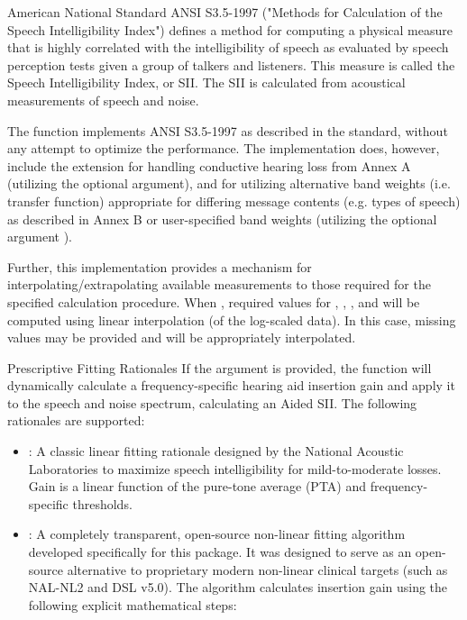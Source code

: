 \documentclass[letterpaper]{book}
\begin{document}
\begin{Details}
American National Standard ANSI S3.5-1997 ("Methods for Calculation of
the Speech Intelligibility Index") defines a method for computing a
physical measure that is highly correlated with the intelligibility
of speech as evaluated by speech perception tests given a group of
talkers and listeners. This measure is called the Speech
Intelligibility Index, or SII. The SII is calculated from acoustical
measurements of speech and noise.

The  function implements ANSI S3.5-1997 as described in
the standard, without any attempt to optimize the performance. The
implementation does, however, include the extension for handling
conductive hearing loss from Annex A (utilizing the optional
 argument), and for utilizing alternative band weights
(i.e. transfer function) appropriate for differing message contents
(e.g. types of speech) as described in Annex B or user-specified
band weights (utilizing the optional argument ).

Further, this implementation provides a mechanism for
interpolating/extrapolating available measurements to those required
for the specified calculation procedure.  When
, required values for ,
, , and  will be computed 
using linear interpolation (of the log-scaled data).  In this case,
missing values may be provided and will be appropriately
interpolated.

%
\begin{SubSection}{Prescriptive Fitting Rationales}
If the  argument is provided, the function will dynamically calculate a frequency-specific hearing aid insertion gain and apply it to the speech and noise spectrum, calculating an Aided SII. The following rationales are supported:

\begin{itemize}

\item{} : A classic linear fitting rationale designed by the National Acoustic Laboratories to maximize speech intelligibility for mild-to-moderate losses. Gain is a linear function of the pure-tone average (PTA) and frequency-specific thresholds.
\item{} : A completely transparent, open-source non-linear fitting algorithm developed specifically for this package. It was designed to serve as an open-source alternative to proprietary modern non-linear clinical targets (such as NAL-NL2 and DSL v5.0). The algorithm calculates insertion gain using the following explicit mathematical steps:
\begin{enumerate}


\end{enumerate}
\end{itemize}
\end{SubSection}
\end{Details}
\end{document}
